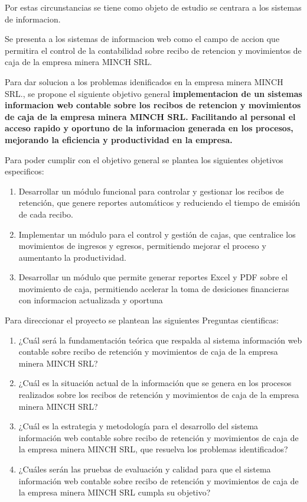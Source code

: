 \documentclass[stu]{apa7}
\begin{document}
Por estas circunstancias se tiene como objeto de estudio se centrara a los sistemas de informacion.

Se presenta a los sistemas de informacion web como el campo de accion que permitira el control de la contabilidad sobre recibo de retencion y movimientos de caja de la empresa minera MINCH SRL.

Para dar solucion a los problemas idenificados en la empresa minera MINCH SRL., se propone el siguiente objetivo general \textbf{implementacion de un sistemas informacion web contable sobre los recibos de retencion y movimientos de caja de la empresa minera MINCH SRL. Facilitando al personal el acceso rapido y oportuno de la informacion generada en los procesos, mejorando la eficiencia y productividad en la empresa.}

Para poder cumplir con el objetivo general se plantea los siguientes objetivos especificos:

\begin{enumerate}
    \item Desarrollar un módulo funcional para controlar y gestionar los recibos de retención, que genere reportes automáticos y reduciendo el tiempo de emisión de cada recibo.

    \item Implementar un módulo para el control y gestión de cajas, que centralice los movimientos de ingresos y egresos, permitiendo mejorar el proceso y aumentanto la productividad.

    \item Desarrollar un módulo que permite generar reportes Excel y PDF sobre el movimiento de caja, permitiendo acelerar la toma de desiciones financieras con informacion actualizada y oportuna
\end{enumerate}

Para direccionar el proyecto se plantean las siguientes Preguntas cientificas:

\begin{enumerate}
    \item ¿Cuál será la fundamentación teórica que respalda al sistema información web contable sobre recibo de retención y movimientos de caja de la empresa minera MINCH SRL?

    \item ¿Cuál es la situación actual de la información que se genera en los procesos realizados sobre los recibos de retención y movimientos de caja de la empresa minera MINCH SRL?

    \item ¿Cuál es la estrategia y metodología para el desarrollo del sistema información web contable sobre recibo de retención y movimientos de caja de la empresa minera MINCH SRL, que resuelva los problemas identificados?

    \item ¿Cuáles serán las pruebas de evaluación y calidad para que el sistema información web contable sobre recibo de retención y movimientos de caja de la empresa minera MINCH SRL cumpla su objetivo?
\end{enumerate}
\end{document}
